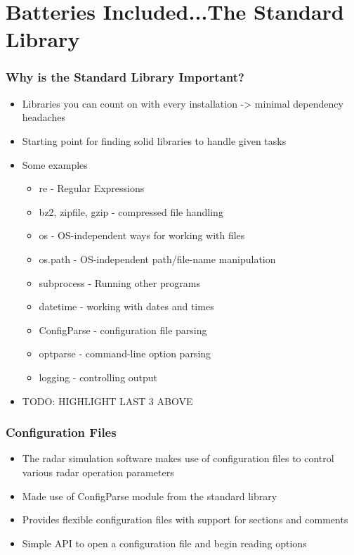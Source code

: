 \documentclass[red, hyperref={pdfpagelabels=false}]{beamer}
\begin{document}
\section[The Standard Library]{Batteries Included...The Standard Library}
\begin{frame}
  \frametitle{Why is the Standard Library Important?}
  \begin{itemize}
    \item Libraries you can count on with every installation -> minimal dependency headaches
    \item Starting point for finding solid libraries to handle given tasks
    \item Some examples
      \begin{itemize}
        \item re - Regular Expressions
        \item bz2, zipfile, gzip - compressed file handling
        \item os - OS-independent ways for working with files
        \item os.path - OS-independent path/file-name manipulation
        \item subprocess - Running other programs
        \item datetime - working with dates and times
        \item ConfigParse - configuration file parsing
        \item optparse - command-line option parsing
        \item logging - controlling output
      \end{itemize}
    \item TODO: HIGHLIGHT LAST 3 ABOVE
  \end{itemize}
\end{frame}

\begin{frame}
  \frametitle{Configuration Files}
  \begin{itemize}
    \item The radar simulation software makes use of configuration files to
      control various radar operation parameters
    \item Made use of ConfigParse module from the standard library
    \item Provides flexible configuration files with support for sections and comments
    \item Simple API to open a configuration file and begin reading options
  \end{itemize}
\end{frame}
\end{document}
